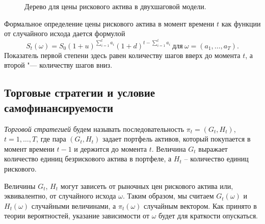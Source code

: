 \begin{figure}[h]
\centering
{}
\caption{Дерево для цены рискового актива в двухшаговой модели.}
\label{crr:tree}
\end{figure}

\begin{remark}
Формальное определение цены рискового актива в момент времени $t$ как функции от случайного исхода дается формулой
\[
S_t(\omega) = S_0 (1+u)^{\sum_{i=1}^t a_i} (1+d)^{t-\sum_{i=1}^t a_i}\ \text{для}\ \omega = (a_1,\dots,a_T).
\]
Показатель первой степени здесь равен количеству шагов вверх до момента $t$, а второй "--- количеству шагов вниз.
\end{remark}


\subsection{Торговые стратегии и условие самофинансируемости}

\emph{Торговой стратегией} будем называть последовательность $\pi_t=(G_t,H_t)$, $t=1,\dots,T$, где пара $(G_t,H_t)$ задает портфель активов, который покупается в момент времени $t-1$ и держится до момента $t$.
Величина $G_t$ выражает количество единиц безрискового актива в портфеле, а $H_t$ -- количество единиц рискового. 

Величины $G_t$, $H_t$ могут зависеть от рыночных цен рискового актива или, эквивалентно, от случайного исхода $\omega$.
Таким образом, мы считаем $G_t(\omega)$ и $H_t(\omega)$ случайными величинами, а $\pi_t(\omega)$ случайным вектором.
Как принято в теории вероятностей, указание зависимости от $\omega$ будет для краткости опускаться.

